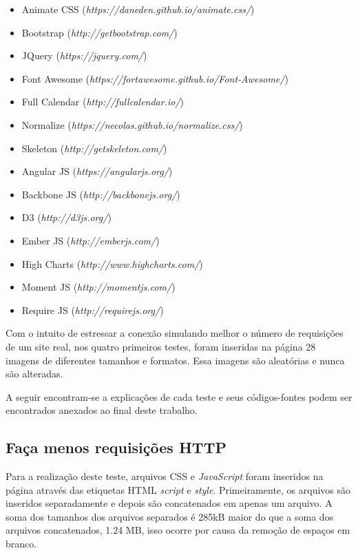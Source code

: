 \begin{itemize}
	\item Animate CSS (\textit{https://daneden.github.io/animate.css/})
	\item Bootstrap (\textit{http://getbootstrap.com/})
	\item JQuery (\textit{https://jquery.com/})
	\item Font Awesome (\textit{https://fortawesome.github.io/Font-Awesome/})
	\item Full Calendar (\textit{http://fullcalendar.io/})
	\item Normalize (\textit{https://necolas.github.io/normalize.css/})
	\item Skeleton (\textit{http://getskeleton.com/})
	\item Angular JS (\textit{https://angularjs.org/})
	\item Backbone JS (\textit{http://backbonejs.org/})
	\item D3 (\textit{http://d3js.org/})
	\item Ember JS (\textit{http://emberjs.com/})
	\item High Charts (\textit{http://www.highcharts.com/})
	\item Moment JS (\textit{http://momentjs.com/})
	\item Require JS (\textit{http://requirejs.org/})
\end{itemize}

Com o intuito de estressar a conexão simulando melhor o número de requisições de um site real, nos quatro primeiros testes, foram inseridas na página 28 imagens de diferentes tamanhos e formatos. Essa imagens são aleatórias e nunca são alteradas.

A seguir encontram-se a explicações de cada teste e seus códigos-fontes podem ser encontrados anexados ao final deste trabalho.

\subsection{Faça menos requisições HTTP}
\label{facamenosrequisicoeshttp}

Para a realização deste teste, arquivos CSS e \textit{JavaScript} foram inseridos na página através das etiquetas HTML \textit{script} e \textit{style}. Primeiramente, os arquivos são inseridos separadamente e depois são concatenados em apenas um arquivo. A soma dos tamanhos dos arquivos separados é 285kB maior do que a soma dos arquivos concatenados, 1.24 MB, isso ocorre por causa da remoção de espaços em branco.

